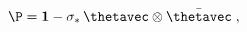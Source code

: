 \begin{equation}
\label{e5:30}
\P={\mathbf 1}-\sigma_{\ast}\, \thetavec \otimes \bar{\thetavec} \; ,
\end{equation}

